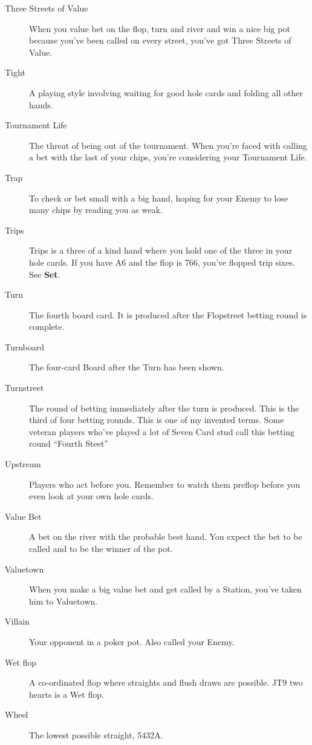 \begin{description}
\item[Three Streets of Value] When you value bet on the flop, turn
and river and win a nice big pot because you've been called on every
street, you've got Three Streets of Value.

\item[Tight] A playing style involving waiting for good hole cards and
folding all other hands.

\item[Tournament Life] The threat of being out of the tournament. When
you're faced with calling a bet with the last of your chips, you're
considering your Tournament Life.

\item[Trap] To check or bet small with a big hand, hoping for your Enemy
to lose many chips by reading you as weak.

\item[Trips] Trips is a three of a kind hand where you hold one of the
three in your hole cards. If you have A6 and the flop is 766, you've
flopped trip sixes. See \textbf{Set}.

\item[Turn] The fourth board card. It is produced after the Flopstreet
betting round is complete.

\item[Turnboard] The four-card Board after the Turn has been shown.

\item[Turnstreet] The round of betting immediately after the turn is
produced. This is the third of four betting rounds. This is one
of my invented terms. Some veteran players who've played a lot of
Seven Card stud call this betting round ``Fourth Steet''

\item[Upstream] Players who act before you. Remember to watch them
preflop before you even look at your own hole cards.

\item[Value Bet] A bet on the river with the probable best hand. You
expect the bet to be called and to be the winner of the pot.

\item[Valuetown] When you make a big value bet and get called by
a Station, you've taken him to Valuetown.

\item[Villain] Your opponent in a poker pot. Also called your Enemy.

\item[Wet flop] A co-ordinated flop where straights and flush draws
are possible. JT9 two hearts is a Wet flop.

\item[Wheel] The lowest possible straight, 5432A.

\end{description}
